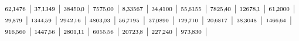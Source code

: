 \documentclass[12pt,fleqn]{article}
\theoremstyle{aufg}
\theoremstyle{bsp}
\begin{document}
\begin{flushleft}
$ \scriptstyle62,\hspace{-1pt}1476$ | $ \scriptstyle37,\hspace{-1pt}1349$ | $ \scriptstyle38450,\hspace{-1pt}0$ | $ \scriptstyle7575,\hspace{-1pt}00$ | $ \scriptstyle8,\hspace{-1pt}33567$ | $ \scriptstyle34,\hspace{-1pt}4100$ | $ \scriptstyle55,\hspace{-1pt}6155$ | $ \scriptstyle7825,\hspace{-1pt}40$ | $ \scriptstyle12678,\hspace{-1pt}1$ | $ \scriptstyle61,\hspace{-1pt}2000$ | $ \scriptstyle29,\hspace{-1pt}879$ | $ \scriptstyle1344,\hspace{-1pt}59$ | $ \scriptstyle2942,\hspace{-1pt}16$ | $ \scriptstyle4803,\hspace{-1pt}03$ | $ \scriptstyle56,\hspace{-1pt}7195$ | $ \scriptstyle37,\hspace{-1pt}0890$ | $ \scriptstyle129,\hspace{-1pt}710$ | $ \scriptstyle20,\hspace{-1pt}6817$ | $ \scriptstyle38,\hspace{-1pt}3048$ | $ \scriptstyle1466,\hspace{-1pt}64$ | $ \scriptstyle916,\hspace{-1pt}560$ | $ \scriptstyle1447,\hspace{-1pt}56$ | $ \scriptstyle2801,\hspace{-1pt}11$ | $ \scriptstyle6055,\hspace{-1pt}56$ | $ \scriptstyle20723,\hspace{-1pt}8$ | $ \scriptstyle227,\hspace{-1pt}240$ | $ \scriptstyle973,\hspace{-1pt}830$ | \end{flushleft} 
\end{document}
